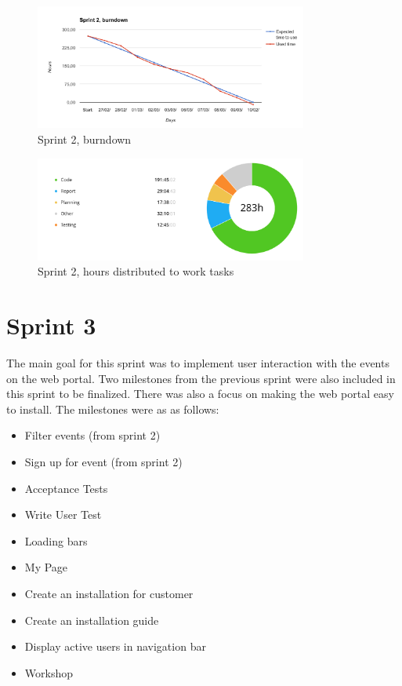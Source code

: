 \begin{figure}[ht]
\centering
    \includegraphics[width=0.8\textwidth]{fig/sprint2}
\caption{Sprint 2, burndown}
\end{figure}

\begin{figure}[ht]
\centering
    \includegraphics[width=0.8\textwidth]{fig/sprint2-diagram}
\caption{Sprint 2, hours distributed to work tasks}
\end{figure}

\section{Sprint 3}
\label{sprint3}
The main goal for this sprint was to implement user interaction with the events on the web portal. Two milestones from the previous sprint were also included in this sprint to be finalized. There was also a focus on making the web portal easy to install. The milestones were as as follows: 

\begin{itemize}
    \item Filter events (from sprint 2)
    \item Sign up for event (from sprint 2)
    \item Acceptance Tests
    \item Write User Test
    \item Loading bars
    \item My Page
    \item Create an installation for customer
    \item Create an installation guide
    \item Display active users in navigation bar
    \item Workshop
\end{itemize}

